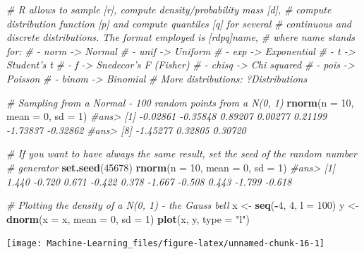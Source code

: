 \documentclass[]{book}
\newenvironment{Shaded}{\begin{snugshade}}{\end{snugshade}}
\newcommand{\KeywordTok}[1]{\textcolor[rgb]{0.13,0.29,0.53}{\textbf{#1}}}
\newcommand{\DataTypeTok}[1]{\textcolor[rgb]{0.13,0.29,0.53}{#1}}
\newcommand{\DecValTok}[1]{\textcolor[rgb]{0.00,0.00,0.81}{#1}}
\newcommand{\StringTok}[1]{\textcolor[rgb]{0.31,0.60,0.02}{#1}}
\newcommand{\CommentTok}[1]{\textcolor[rgb]{0.56,0.35,0.01}{\textit{#1}}}
\newcommand{\OperatorTok}[1]{\textcolor[rgb]{0.81,0.36,0.00}{\textbf{#1}}}
\newcommand{\NormalTok}[1]{#1}
\theoremstyle{definition}
\theoremstyle{definition}
\theoremstyle{definition}
\theoremstyle{remark}
\begin{document}
\begin{Shaded}
\begin{Highlighting}[]
\CommentTok{# R allows to sample [r], compute density/probability mass [d],}
\CommentTok{# compute distribution function [p] and compute quantiles [q] for several}
\CommentTok{# continuous and discrete distributions. The format employed is [rdpq]name,}
\CommentTok{# where name stands for:}
\CommentTok{# - norm -> Normal}
\CommentTok{# - unif -> Uniform}
\CommentTok{# - exp -> Exponential}
\CommentTok{# - t -> Student's t}
\CommentTok{# - f -> Snedecor's F (Fisher)}
\CommentTok{# - chisq -> Chi squared}
\CommentTok{# - pois -> Poisson}
\CommentTok{# - binom -> Binomial}
\CommentTok{# More distributions: ?Distributions}


\CommentTok{# Sampling from a Normal - 100 random points from a N(0, 1)}
\KeywordTok{rnorm}\NormalTok{(}\DataTypeTok{n =} \DecValTok{10}\NormalTok{, }\DataTypeTok{mean =} \DecValTok{0}\NormalTok{, }\DataTypeTok{sd =} \DecValTok{1}\NormalTok{)}
\CommentTok{#ans>  [1] -0.02861 -0.35848  0.89207  0.00277  0.21199 -1.73837 -0.32862}
\CommentTok{#ans>  [8] -1.45277  0.32805  0.30720}

\CommentTok{# If you want to have always the same result, set the seed of the random number}
\CommentTok{# generator}
\KeywordTok{set.seed}\NormalTok{(}\DecValTok{45678}\NormalTok{)}
\KeywordTok{rnorm}\NormalTok{(}\DataTypeTok{n =} \DecValTok{10}\NormalTok{, }\DataTypeTok{mean =} \DecValTok{0}\NormalTok{, }\DataTypeTok{sd =} \DecValTok{1}\NormalTok{)}
\CommentTok{#ans>  [1]  1.440 -0.720  0.671 -0.422  0.378 -1.667 -0.508  0.443 -1.799 -0.618}

\CommentTok{# Plotting the density of a N(0, 1) - the Gauss bell}
\NormalTok{x <-}\StringTok{ }\KeywordTok{seq}\NormalTok{(}\OperatorTok{-}\DecValTok{4}\NormalTok{, }\DecValTok{4}\NormalTok{, }\DataTypeTok{l =} \DecValTok{100}\NormalTok{)}
\NormalTok{y <-}\StringTok{ }\KeywordTok{dnorm}\NormalTok{(}\DataTypeTok{x =}\NormalTok{ x, }\DataTypeTok{mean =} \DecValTok{0}\NormalTok{, }\DataTypeTok{sd =} \DecValTok{1}\NormalTok{)}
\KeywordTok{plot}\NormalTok{(x, y, }\DataTypeTok{type =} \StringTok{"l"}\NormalTok{)}
\end{Highlighting}
\end{Shaded}

\begin{center}\texttt{[image: Machine-Learning\_files/figure-latex/unnamed-chunk-16-1]} \end{center}
\end{document}
